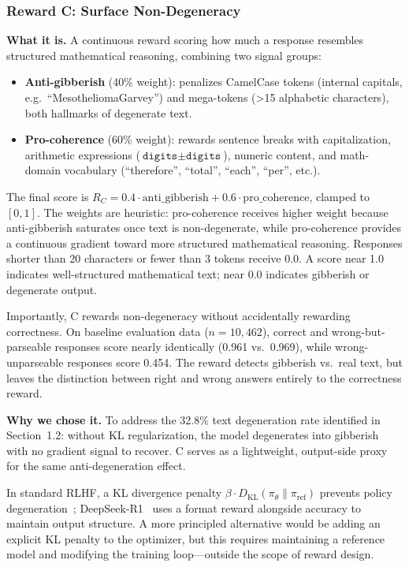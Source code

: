 \subsubsection{Reward C: Surface Non-Degeneracy}
\nestindent

\textbf{What it is.}
A continuous reward scoring how much a response resembles structured mathematical reasoning, combining two signal groups:
\begin{itemize}[nosep]
    \item \textbf{Anti-gibberish} (40\% weight): penalizes CamelCase tokens (internal capitals, e.g.\ ``MesotheliomaGarvey'') and mega-tokens ({>}15 alphabetic characters), both hallmarks of degenerate text.
    \item \textbf{Pro-coherence} (60\% weight): rewards sentence breaks with capitalization, arithmetic expressions ($\texttt{digits} \pm \texttt{digits}$), numeric content, and math-domain vocabulary (``therefore'', ``total'', ``each'', ``per'', etc.).
\end{itemize}
The final score is $R_C = 0.4 \cdot \text{anti\_gibberish} + 0.6 \cdot \text{pro\_coherence}$, clamped to $[0, 1]$.
The weights are heuristic: pro-coherence receives higher weight because anti-gibberish saturates once text is non-degenerate, while pro-coherence provides a continuous gradient toward more structured mathematical reasoning.
Responses shorter than 20 characters or fewer than 3 tokens receive 0.0.
A score near 1.0 indicates well-structured mathematical text; near 0.0 indicates gibberish or degenerate output.

Importantly, C rewards non-degeneracy without accidentally rewarding correctness.
On baseline evaluation data ($n = 10{,}462$), correct and wrong-but-parseable responses score nearly identically (0.961 vs.\ 0.969), while wrong-unparseable responses score 0.454.
The reward detects gibberish vs.\ real text, but leaves the distinction between right and wrong answers entirely to the correctness reward.

\textbf{Why we chose it.}
To address the 32.8\% text degeneration rate identified in Section~1.2: without KL regularization, the model degenerates into gibberish with no gradient signal to recover.
C serves as a lightweight, output-side proxy for the same anti-degeneration effect.

In standard RLHF, a KL divergence penalty $\beta \cdot D_\text{KL}(\pi_\theta \| \pi_\text{ref})$ prevents policy degeneration~\cite{ouyang2022training, stiennon2020summarize}; DeepSeek-R1~\cite{deepseekr1} uses a format reward alongside accuracy to maintain output structure.
A more principled alternative would be adding an explicit KL penalty to the optimizer, but this requires maintaining a reference model and modifying the training loop---outside the scope of reward design.
\nestunindent
